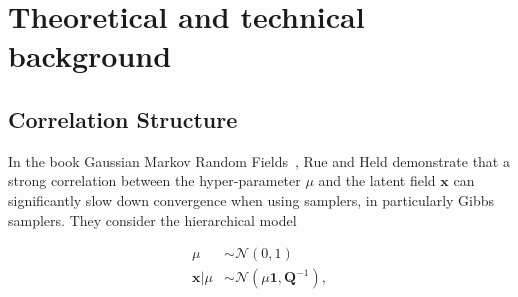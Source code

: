 \chapter{Theoretical and technical background}

\section{Correlation Structure}
\label{ap:Correlation}
In the book Gaussian Markov Random Fields~\cite{rue2005gaussian}, Rue and Held demonstrate that a strong correlation between the hyper-parameter $\mu$ and the latent field $\bm{x}$ can significantly slow down convergence when using samplers, in particularly Gibbs samplers. 
They consider the hierarchical model

\begin{subequations}
	\begin{align}
		\mu &\sim \mathcal{N}(0, 1) \\
		\bm{x} | \mu &\sim \mathcal{N}(\mu \bm{1}, \bm{Q}^{-1}),
	\end{align}
	\label{eq:rueMod}
\end{subequations}

